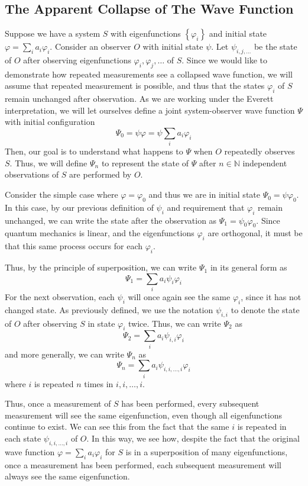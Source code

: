 \documentclass[
    12pt,
    letterpaper,
    aps,
    prd,
    longbibliography,
    twocolumn,
    nofootinbib,
    raggedbottom,
    amsmath,
    amssymb,
    amsfonts,
]{revtex4-1}
\newcommand{\set}[1]{\left\{#1\right\}}
\newcommand{\bbm}[1]{\mathbb{#1}}
\renewcommand{\phi}{\varphi}
\begin{document}
\subsection{The Apparent Collapse of The Wave Function}
\label{sec:mwi}

Suppose we have a system $S$ with eigenfunctions $\set{\phi_i}$ and initial state $\phi = \sum_i a_i \phi_i$. Consider an observer $O$ with initial state $\psi$. Let $\psi_{i,j,\ldots}$ be the state of $O$ after observing eigenfunctions $\phi_i, \phi_j, \ldots$ of $S$. Since we would like to demonstrate how repeated measurements see a collapsed wave function, we will assume that repeated measurement is possible, and thus that the states $\phi_i$ of $S$ remain unchanged after observation. As we are working under the Everett interpretation, we will let ourselves define a joint system-observer wave function $\Psi$ with initial configuration
\[
    \Psi_0 = \psi \phi = \psi \sum_i a_i \phi_i
\]
Then, our goal is to understand what happens to $\Psi$ when $O$ repeatedly observes $S$. Thus, we will define $\Psi_n$ to represent the state of $\Psi$ after $n \in \bbm N$ independent observations of $S$ are performed by $O$.

Consider the simple case where $\phi = \phi_0$ and thus we are in initial state $\Psi_0 = \psi \phi_0$. In this case, by our previous definition of $\psi_i$ and requirement that $\phi_i$ remain unchanged, we can write the state after the observation as $\Psi_1 = \psi_0 \phi_0$. Since quantum mechanics is linear, and the eigenfunctions $\phi_i$ are orthogonal, it must be that this same process occurs for each $\phi_i$.

Thus, by the principle of superposition, we can write $\Psi_1$ in its general form as
\[
    \Psi_1 = \sum_i a_i \psi_i \phi_i
\]
For the next observation, each $\psi_i$ will once again see the same $\phi_i$, since it has not changed state. As previously defined, we use the notation $\psi_{i, i}$ to denote the state of $O$ after observing $S$ in state $\phi_i$ twice. Thus, we can write $\Psi_2$ as
\[
    \Psi_2 = \sum_i a_i \psi_{i,i} \phi_i
\]
and more generally, we can write $\Psi_n$ as
\[
    \Psi_n = \sum_i a_i \psi_{i,i,\ldots,i} \phi_i
\]
where $i$ is repeated $n$ times in $i,i,\ldots,i$.

Thus, once a measurement of $S$ has been performed, every subsequent measurement will see the same eigenfunction, even though all eigenfunctions continue to exist. We can see this from the fact that the same $i$ is repeated in each state $\psi_{i,i,\ldots,i}$ of $O$. In this way, we see how, despite the fact that the original wave function $\phi = \sum_i a_i \phi_i$ for $S$ is in a superposition of many eigenfunctions, once a measurement has been performed, each subsequent measurement will always see the same eigenfunction.
\end{document}
